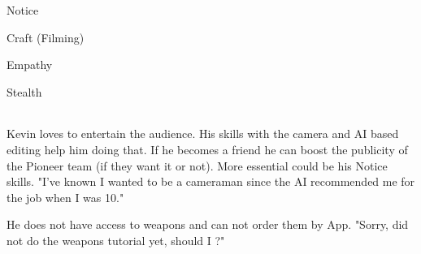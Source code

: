 \begin{npcBox}[title=Kevin\, Camera]

    \begin{aspects}
    \item {}
    \item {}    
    \end{aspects}
    
    \begin{skills}
    \item {} Notice
    \item {} Craft (Filming)
    \item {} Empathy
    \item {} Stealth
    \end{skills}
    
    \begin{stunts}
    \item {}
    \end{stunts}
    
    \begin{stressSection}
    \end{stressSection}
    \begin{tabularx}{\textwidth}{ XX }
    \end{tabularx}
    
    \begin{consequences}
    \item {}
    \item {}
    \item {}
    \end{consequences}
    
    \begin{npcDescription}
    Kevin loves to entertain the audience. His skills with the camera and AI based editing help him doing that. If he becomes a friend he can boost the publicity of the Pioneer team (if they want it or not). More essential could be his Notice skills.
    "I've known I wanted to be a cameraman since the AI recommended me for the job when I was 10."


    He does not have access to weapons and can not order them by App. "Sorry, did not do the weapons tutorial yet, should I ?"

    \end{npcDescription}
    
\end{npcBox}



